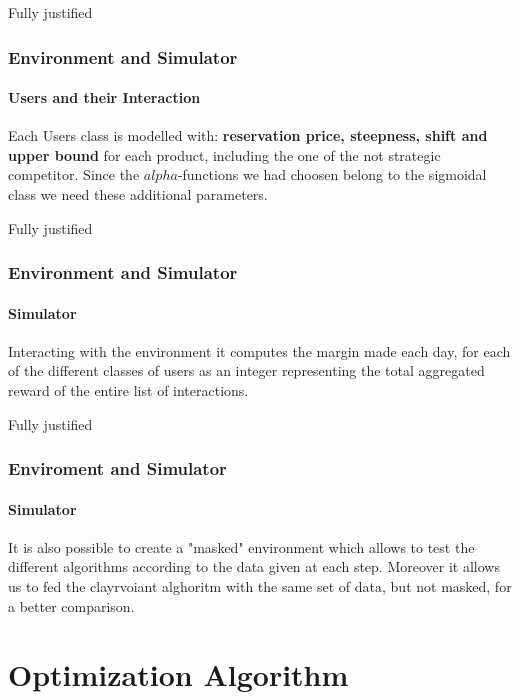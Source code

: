 \documentclass{beamer}
\begin{document}

\begin {frame}{Fully justified}

\frametitle{Environment and Simulator}
\framesubtitle{Users and their Interaction}
Each Users class is modelled with:\textbf{ reservation price, steepness, shift and upper bound}
for each product, including the one of the not strategic competitor.
Since the $alpha$-functions we had choosen belong to the sigmoidal class we need these additional parameters.

\end {frame}


\begin {frame}{Fully justified}

\frametitle{Environment and Simulator}
\framesubtitle{Simulator}
Interacting with the environment it computes the margin made each day, for each of the different classes of users as an integer representing the total aggregated reward of the entire list of interactions.

\end{frame}


\begin {frame}{Fully justified}

\frametitle{Enviroment and Simulator}
\framesubtitle{Simulator}
It is also possible to create a "masked" environment which allows to test the different algorithms according to the data given at each step. Moreover it allows us to fed the clayrvoiant alghoritm with the same set of data, but not masked, for a better comparison.

\end{frame}


\AtBeginSection[]
{
\begin{frame}{}
    \tableofcontents[currentsection]
\end{frame}
}


\section{Optimization Algorithm}
\end{document}
